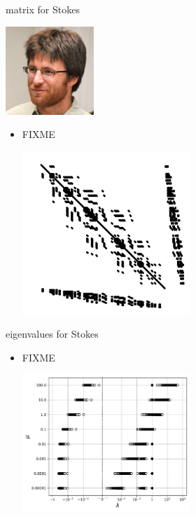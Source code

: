 \documentclass[10pt,hyperref,dvipsnames]{beamer}
\begin{document}
\begin{frame}{matrix for Stokes}

\hfill \includegraphics[width=0.25\textwidth]{figs/people/jbrown.png}

\vspace{-20mm}
\begin{itemize}
\item FIXME
\begin{center}
\includegraphics[width=0.5\textwidth]{figs/Kstokes.pdf}
\end{center}
\end{itemize}
\end{frame}


\begin{frame}{eigenvalues for Stokes}

\begin{itemize}
\item FIXME
\begin{center}
\includegraphics[width=0.5\textwidth]{figs/stokesmueigs.pdf}
\end{center}
\end{itemize}
\end{frame}
\end{document}

